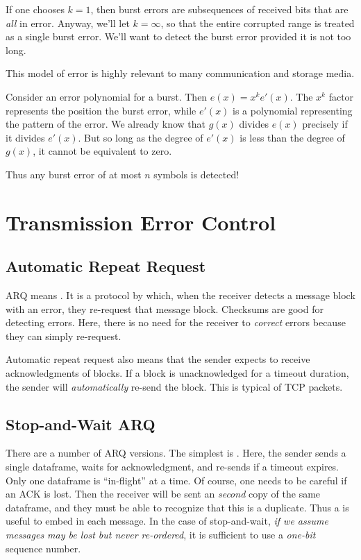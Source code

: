 \documentclass[11pt, oneside]{amsart}
\begin{document}
If one chooses $k=1$, then burst errors are subsequences of received
bits that are \emph{all} in error. Anyway, we'll let $k = \infty$, so
that the entire corrupted range is treated as a single burst error.
We'll want to detect the burst error provided it is not too long.

This model of error is highly relevant to many communication and storage
media.

Consider an error polynomial for a burst. Then $e(x) = x^k e'(x)$. The
$x^k$ factor represents the position the burst error, while $e'(x)$ is a
polynomial representing the pattern of the error. We already know that
$g(x)$ divides $e(x)$ precisely if it divides $e'(x)$. But so long as
the degree of $e'(x)$ is less than the degree of $g(x)$, it cannot be
equivalent to zero.

Thus any burst error of at most $n$ symbols is detected!

\section{Transmission Error Control}

\subsection{Automatic Repeat Request}

ARQ means . It is a protocol by which,
when the receiver detects a message block with an error, they re-request
that message block. Checksums are good for detecting errors. Here, there
is no need for the receiver to \emph{correct} errors because they can
simply re-request.

Automatic repeat request also means that the sender expects to receive
acknowledgments of blocks. If a block is unacknowledged for a timeout
duration, the sender will \emph{automatically} re-send the block. This
is typical of TCP packets.

\subsection{Stop-and-Wait ARQ}

There are a number of ARQ versions. The simplest is
. Here, the sender sends a single dataframe,
waits for acknowledgment, and re-sends if a timeout expires. Only one
dataframe is ``in-flight'' at a time. Of course, one needs to be careful
if an ACK is lost. Then the receiver will be sent an \emph{second} copy
of the same dataframe, and they must be able to recognize that this is a
duplicate. Thus a  is useful to embed in each
message. In the case of stop-and-wait, \emph{if we assume messages may
be lost but never re-ordered}, it is sufficient to use a \emph{one-bit}
sequence number.
\end{document}
